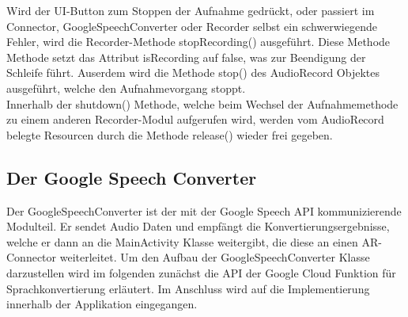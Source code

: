 Wird der UI-Button zum Stoppen der Aufnahme gedrückt, oder passiert im Connector, GoogleSpeechConverter oder Recorder selbst ein schwerwiegende Fehler, wird die Recorder-Methode stopRecording() ausgeführt. Diese Methode Methode setzt das Attribut isRecording auf false, was zur Beendigung der Schleife führt. Auserdem wird die Methode stop() des AudioRecord Objektes ausgeführt, welche den Aufnahmevorgang stoppt.\\
Innerhalb der shutdown() Methode, welche beim Wechsel der Aufnahmemethode zu einem anderen Recorder-Modul aufgerufen wird, werden vom AudioRecord belegte Resourcen durch die Methode release() wieder frei gegeben.
\subsection{Der Google Speech Converter}
Der GoogleSpeechConverter ist der mit der Google Speech API kommunizierende Modulteil. Er sendet Audio Daten und empfängt die Konvertierungsergebnisse, welche er dann an die MainActivity Klasse weitergibt, die diese an einen AR-Connector weiterleitet. Um den Aufbau der GoogleSpeechConverter Klasse darzustellen wird im folgenden zunächst die API der Google Cloud Funktion für Sprachkonvertierung erläutert. Im Anschluss wird auf die Implementierung innerhalb der Applikation eingegangen. 

